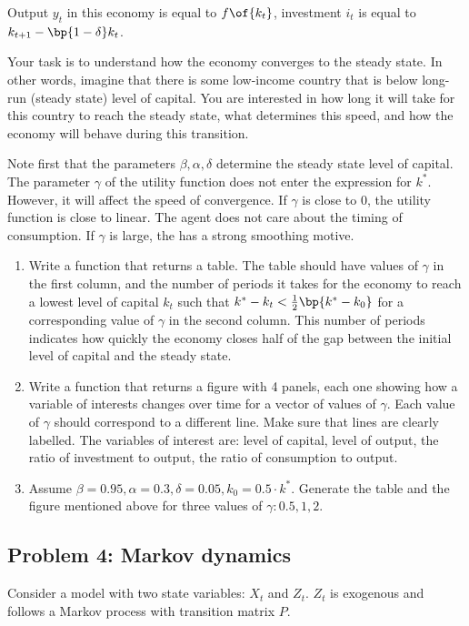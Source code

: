 \documentclass[english,hyperref={pdftex,pdfpagemode=UseNone,hidelinks}]{tufte-handout}
\begin{document}
Output $y_t$ in this economy is equal to $f\of{k_t}$, investment $i_t$ is equal to $k_{t+1} - \bp{1-\delta} k_t$.


Your task is to understand how the economy converges to the steady state. In other words, imagine that there is some low-income country that is below long-run (steady state) level of capital. You are interested in how long it will take for this country to reach the steady state, what determines this speed, and how the economy will behave during this transition.

Note first that the parameters $\beta, \alpha, \delta$ determine the steady state level of capital. The parameter $\gamma$ of the utility function does not enter the expression for $k^*$. However, it will affect the speed of convergence. If $\gamma$ is close to 0, the utility function is close to linear. The agent does not care about the timing of consumption. If $\gamma$ is large, the has a strong smoothing motive. 



\begin{enumerate} 
    \item Write a function that returns a table. The table should have values of $\gamma$ in the first column, and the number of periods it takes for the economy to reach a lowest level of capital $k_t$ such that $k^* - k_t < \frac{1}{2} \bp{k^* - k_0}$ for a corresponding value of $\gamma$ in the second column. This number of periods indicates how quickly the economy closes half of the gap between the initial level of capital and the steady state. 
    \item Write a function that returns a figure with 4 panels, each one showing how a variable of interests changes over time for a vector of values of $\gamma$. Each value of $\gamma$ should correspond to a different line. Make sure that lines are clearly labelled. The variables of interest are: level of capital, level of output, the ratio of investment to output, the ratio of consumption to output.
    \item Assume $\beta = 0.95, \alpha = 0.3, \delta = 0.05, k_0 = 0.5 \cdot k^*$. Generate the table and the figure mentioned above for three values of $\gamma: 0.5,1,2$. 
\end{enumerate}


\subsection*{Problem 4: Markov dynamics}
Consider a model with two state variables: $X_t$ and $Z_t$. $Z_t$ is exogenous and follows a Markov process with transition matrix $P$. 
\end{document}
